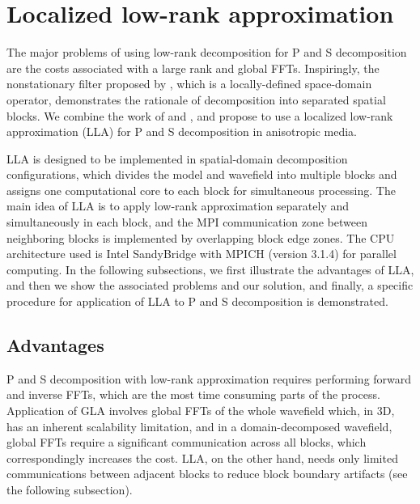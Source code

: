 \documentclass[manuscript,ulem,graphix,revised]{geophysics}
\begin{document}
\section {Localized low-rank approximation}
\indent\indent
The major problems of using low-rank decomposition for P and S decomposition are the costs associated with a large rank and global FFTs. Inspiringly, the nonstationary filter proposed by \citet{yan09}, which is a locally-defined space-domain operator, demonstrates the rationale of decomposition into separated spatial blocks. We combine the work of \citet{yan09} and \citet{cheng14}, and propose to use a localized low-rank approximation (LLA) for P and S decomposition in anisotropic media.

LLA is designed to be implemented in spatial-domain decomposition configurations, which divides the model and wavefield into multiple blocks and assigns one computational core to each block for simultaneous processing. The main idea of LLA is to apply low-rank approximation separately and simultaneously in each block, and the MPI communication zone between neighboring blocks is implemented by overlapping block edge zones. The CPU architecture used is Intel SandyBridge with MPICH (version 3.1.4) for parallel computing.
In the following subsections, we first illustrate the advantages of LLA, and then we show the associated problems and our solution, and finally, a specific procedure for application of LLA to P and S decomposition is demonstrated.



\subsection{Advantages}
\indent\indent
P and S decomposition with low-rank approximation requires performing forward and inverse FFTs, which are the most time consuming parts of the process. 
Application of GLA involves global FFTs of the whole wavefield which, in 3D, has an inherent scalability limitation, and in a domain-decomposed wavefield, global FFTs require a significant communication across all blocks, which correspondingly increases the cost. LLA, on the other hand, needs only limited communications between adjacent blocks to reduce block boundary artifacts (see the following subsection).
\end{document}
